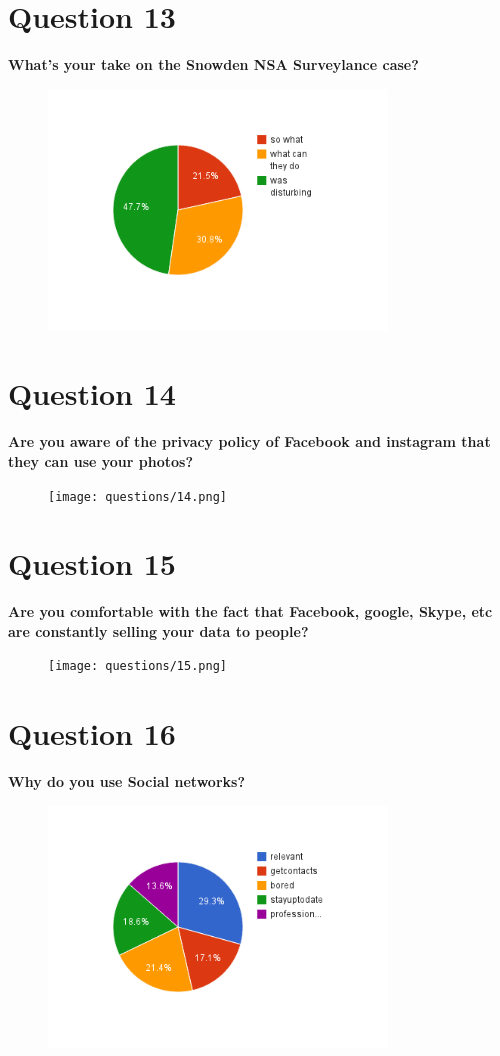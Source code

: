 \documentclass[11pt]{book}
\begin{document}
\chapter{Question 13}
\textbf{What's your take on the Snowden NSA Surveylance case?
}
\begin{figure}[ht!]
	\centering
	\includegraphics[width=90mm]{questions/13.png}
	\label{overflow}
\end{figure}

\newpage
\chapter{Question 14}
\textbf{Are you aware of the privacy policy of Facebook and instagram that they can use your photos?
}
\begin{figure}[ht!]
	\centering
	\texttt{[image: questions/14.png]}
	\label{overflow}
\end{figure}

\newpage
\chapter{Question 15}
\textbf{Are you comfortable with the fact that Facebook, google, Skype, etc are constantly selling your data to people?
}
\begin{figure}[ht!]
	\centering
	\texttt{[image: questions/15.png]}
	\label{overflow}
\end{figure}

\newpage
\chapter{Question 16}
\textbf{Why do you use Social networks?}
\begin{figure}[ht!]
	\centering
	\includegraphics[width=90mm]{questions/16.png}
	\label{overflow}
\end{figure}
\end{document}
